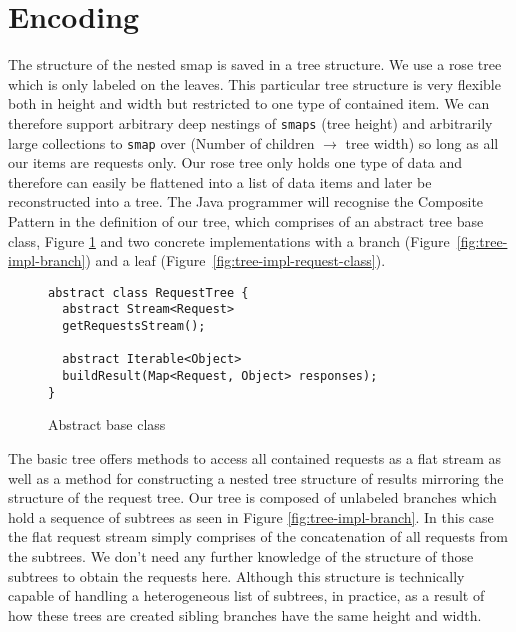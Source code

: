 \section{Encoding}

The structure of the nested smap is saved in a tree structure.
We use a rose tree\cite{MALCOLM1990255} which is only labeled on the leaves.
This particular tree structure is very flexible both in height and width but restricted to one type of contained item.
We can therefore support arbitrary deep nestings of \texttt{smaps} (tree height) and arbitrarily large collections to \texttt{smap} over (Number of children $\rightarrow$ tree width) so long as all our items are requests only.
Our rose tree only holds one type of data and therefore can easily be flattened into a list of data items and later be reconstructed into a tree.
The Java programmer will recognise the Composite Pattern\cite{gamma1995design} in the definition of our tree, which comprises of an abstract tree base class, Figure \ref{fig:tree-impl-base-class} and two concrete implementations with a branch (Figure~\ref{fig:tree-impl-branch}) and a leaf (Figure~\ref{fig:tree-impl-request-class}).

\begin{figure}[h]

\begin{verbatim}
abstract class RequestTree {
  abstract Stream<Request>
  getRequestsStream();

  abstract Iterable<Object>
  buildResult(Map<Request, Object> responses);
}
\end{verbatim}
\caption{Abstract base class}
\label{fig:tree-impl-base-class}

\end{figure}

The basic tree offers methods to access all contained requests as a flat stream as well as a method for constructing a nested tree structure of results mirroring the structure of the request tree.
Our tree is composed of unlabeled branches which hold a sequence of subtrees as seen in Figure \ref{fig:tree-impl-branch}.
In this case the flat request stream simply comprises of the concatenation of all requests from the subtrees.
We don't need any further knowledge of the structure of those subtrees to obtain the requests here.
Although this structure is technically capable of handling a heterogeneous list of subtrees, in practice, as a result of how these trees are created sibling branches have the same height and width.

